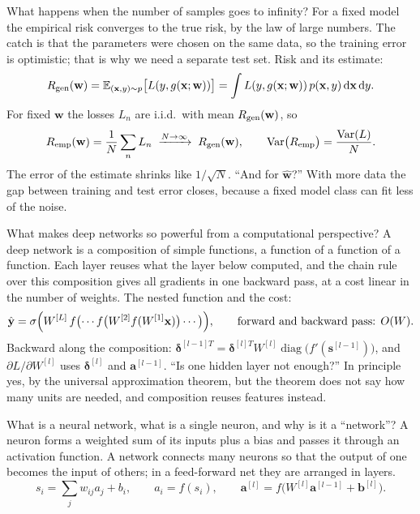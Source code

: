 \begin{qabox}[Küng]{\asked What happens when the number of samples goes to infinity?}
\ans For a fixed model the empirical risk converges to the true risk, by the law of large numbers. The
catch is that the parameters were chosen on the same data, so the training error is optimistic; that is
why we need a separate test set.
\formula Risk and its estimate:
\[ R_{\mathrm{gen}}(\mathbf w)=\mathbb E_{(\mathbf x,y)\sim p}\bigl[L(y,g(\mathbf x;\mathbf w))\bigr]
=\int L(y,g(\mathbf x;\mathbf w))\,p(\mathbf x,y)\,\mathrm d\mathbf x\,\mathrm dy . \]
For fixed $\mathbf w$ the losses $L_n$ are i.i.d.\ with mean $R_{\mathrm{gen}}(\mathbf w)$, so
\[ R_{\mathrm{emp}}(\mathbf w)=\frac1N\sum_n L_n\;\xrightarrow{N\to\infty}\;R_{\mathrm{gen}}(\mathbf w),\qquad
\operatorname{Var}\bigl(R_{\mathrm{emp}}\bigr)=\frac{\operatorname{Var}(L)}{N}. \]
The error of the estimate shrinks like $1/\sqrt N$.
\follow ``And for $\hat{\mathbf w}$?'' With more data the gap between training and test error closes,
because a fixed model class can fit less of the noise.
\end{qabox}

\begin{qabox}[Küng]{\asked What makes deep networks so powerful from a computational perspective?}
\ans A deep network is a composition of simple functions, a function of a function of a function. Each
layer reuses what the layer below computed, and the chain rule over this composition gives all gradients in
one backward pass, at a cost linear in the number of weights.
\formula The nested function and the cost:
\[ \hat{\mathbf y}=\sigma\Bigl(W^{[L]}\,f\bigl(\cdots f\bigl(W^{[2]}f(W^{[1]}\mathbf x)\bigr)\cdots\bigr)\Bigr),\qquad
\text{forward and backward pass: } O(W). \]
Backward along the composition: $\boldsymbol\delta^{[l-1]T}=\boldsymbol\delta^{[l]T}W^{[l]}\operatorname{diag}\bigl(f'(\mathbf s^{[l-1]})\bigr)$, and
$\partial L/\partial W^{[l]}$ uses $\boldsymbol\delta^{[l]}$ and $\mathbf a^{[l-1]}$.
\follow ``Is one hidden layer not enough?'' In principle yes, by the universal approximation theorem, but the
theorem does not say how many units are needed, and composition reuses features instead.
\end{qabox}

\begin{qabox}[Hoedt]{\asked What is a neural network, what is a single neuron, and why is it a ``network''?}
\ans A neuron forms a weighted sum of its inputs plus a bias and passes it through an activation function. A
network connects many neurons so that the output of one becomes the input of others; in a feed-forward net they
are arranged in layers.
\formula \[ s_i=\sum_j w_{ij}a_j+b_i,\qquad a_i=f(s_i),\qquad \mathbf a^{[l]}=f\bigl(W^{[l]}\mathbf a^{[l-1]}+\mathbf b^{[l]}\bigr). \]
\end{qabox}

